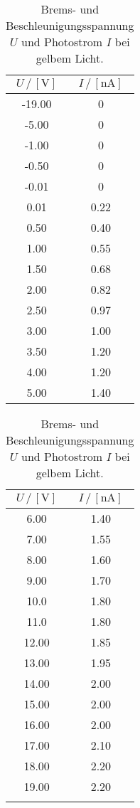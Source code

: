 \begin{table}
  \centering
  \caption{Brems- und Beschleunigungsspannung $U$ und Photostrom $I$ bei gelbem Licht.}
  \begin{tabular}{|c|c|}
    \toprule
    $U \,/\, [\si{\volt}]$ & $I \,/\, [\si{\nano\ampere}]$\\
    \midrule
    -19.00 & 0\\
    -5.00 & 0\\
    -1.00 & 0\\
    -0.50 & 0\\
    -0.01 & 0\\
    0.01 & 0.22\\
    0.50 & 0.40\\
    1.00 & 0.55\\
    1.50 & 0.68\\
    2.00 & 0.82\\
    2.50 & 0.97\\
    3.00 & 1.00\\
    3.50 & 1.20\\
    4.00 & 1.20\\
    5.00 & 1.40\\
    \bottomrule
  \end{tabular}
  \begin{tabular}{|c|c|}
    \toprule
    $U \,/\, [\si{\volt}]$ & $I \,/\, [\si{\nano\ampere}]$\\
    \midrule
    6.00 & 1.40\\
    7.00 & 1.55\\
    8.00 & 1.60\\
    9.00 & 1.70\\
    10.0 & 1.80\\
    11.0 & 1.80\\
    12.00 & 1.85\\
    13.00 & 1.95\\
    14.00 & 2.00\\
    15.00 & 2.00\\
    16.00 & 2.00\\
    17.00 & 2.10\\
    18.00 & 2.20\\
    19.00 & 2.20\\
    \text{---} & \text{---}\\
    \bottomrule 
  \end{tabular}
  \label{tab:gelb}
\end{table}

